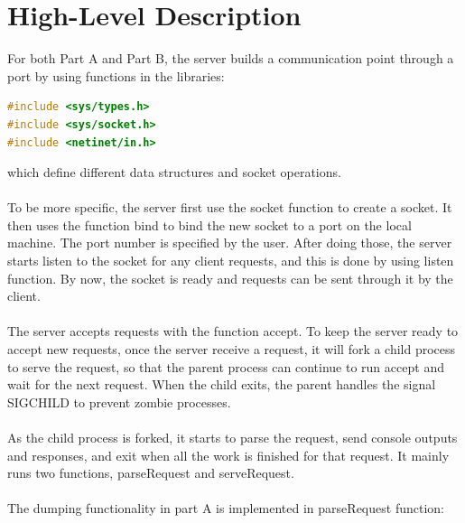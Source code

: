 \documentclass[a4paper, 11pt]{report}
\begin{document}

\section*{High-Level Description}
For both Part A and Part B, the server builds a communication point through a port by using functions in the libraries:

\begin{lstlisting}[language=C]
#include <sys/types.h>
#include <sys/socket.h>
#include <netinet/in.h>
\end{lstlisting}

\noindent which define different data structures and socket operations.\\\\
To be more specific, the server first use the {\selectfont socket} function to create a socket. It then uses the function {\selectfont bind} to bind the new socket to a port on the local machine. The port number is specified by the user.
After doing those, the server starts listen to the socket for any client requests, and this is done by using {\selectfont listen} function. By now, the socket is ready and requests can be sent through it by the client.\\\\

\noindent The server accepts requests with the function {\selectfont accept}. To keep the server ready to accept new requests, once the server receive a request, it will fork a child process to serve the request, so that the parent process can continue to run {\selectfont accept} and wait for the next request. When the child exits, the parent handles the signal {\selectfont SIGCHILD} to prevent zombie processes.\\\\

\noindent As the child process is forked, it starts to parse the request, send console outputs and responses, and exit when all the work is finished for that request. It mainly runs two functions, {\selectfont parseRequest} and {\selectfont serveRequest}.\\\\

\noindent The dumping functionality in part A is implemented in {\selectfont parseRequest} function:
\end{document}
